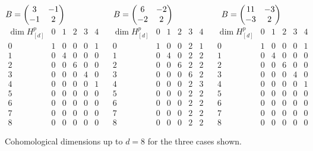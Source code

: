 \documentclass[pdftex]{sigma}
\numberwithin{equation}{section}
\begin{document}
\begin{figure}[t]\centering
$B=\begin{pmatrix}3 & -1 \\ -1 & 2\end{pmatrix}\hspace{20mm} B=\begin{pmatrix} 6 & -2 \\ -2 & 2 \end{pmatrix} \hspace{20mm} B=\begin{pmatrix}11 & -3 \\ -3 & 2 \end{pmatrix}$
\vspace{1mm}\\
$\begin{array}{c|ccccc}
\dim H_{[d]}^p & 0 & 1 & 2 & 3 & 4 \\ \hline
0 & 1 & 0 & 0 & 0 & 1 \\
1 & 0 & 4 & 0 & 0 & 0 \\
2 & 0 & 0 & 6 & 0 & 0 \\
3 & 0 & 0 & 0 & 4 & 0 \\
4 & 0 & 0 & 0 & 0 & 1 \\
5 & 0 & 0 & 0 & 0 & 0 \\
6 & 0 & 0 & 0 & 0 & 0 \\
7 & 0 & 0 & 0 & 0 & 0 \\
8 & 0 & 0 & 0 & 0 & 0
\end{array}\ \ \ \
\begin{array}{c|ccccc}
\dim H_{[d]}^p & 0 & 1 & 2 & 3 & 4 \\ \hline
0 & 1 & 0 & 0 & 2 & 1 \\
1 & 0 & 4 & 0 & 2 & 2 \\
2 & 0 & 0 & 6 & 2 & 2 \\
3 & 0 & 0 & 0 & 6 & 2 \\
4 & 0 & 0 & 0 & 2 & 3 \\
5 & 0 & 0 & 0 & 2 & 2 \\
6 & 0 & 0 & 0 & 2 & 2 \\
7 & 0 & 0 & 0 & 2 & 2 \\
8 & 0 & 0 & 0 & 2 & 2
\end{array}\ \ \ \
\begin{array}{c|ccccc}
\dim H_{[d]}^p & 0 & 1 & 2 & 3 & 4 \\ \hline
0 & 1 & 0 & 0 & 0 & 1 \\
1 & 0 & 4 & 0 & 0 & 0 \\
2 & 0 & 0 & 6 & 0 & 0 \\
3 & 0 & 0 & 0 & 4 & 0 \\
4 & 0 & 0 & 0 & 0 & 1 \\
5 & 0 & 0 & 0 & 0 & 0 \\
6 & 0 & 0 & 0 & 0 & 0 \\
7 & 0 & 0 & 0 & 0 & 0 \\
8 & 0 & 0 & 0 & 0 & 0
\end{array}$
\caption{Cohomological dimensions up to $d=8$ for the three cases shown.}\label{table2_results}
\end{figure}
\end{document}
